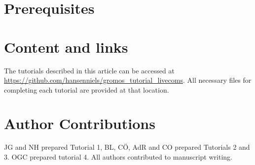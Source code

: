 \documentclass[9pt,tutorial,pubversion]{../includes/livecoms}
\begin{document}



\section{Prerequisites}




\section{Content and links}

The tutorials described in this article can be accessed at \url{https://github.com/hansenniels/gromos_tutorial_livecoms}. All necessary files for completing each tutorial are provided at that location.

%








\section{Author Contributions}
%

JG and NH prepared Tutorial 1, BL, C\"O, AdR and CO prepared Tutorials 2 and 3. OGC prepared tutorial 4. All authors contributed to manuscript writing.
\end{document}
